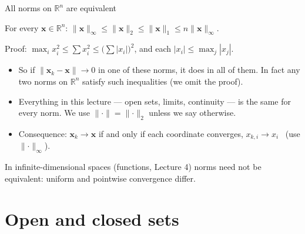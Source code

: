 \documentclass[10pt]{wosm-slides}
\newcommand{\R}{\mathbb{R}}
\newcommand{\norm}[1]{\lVert #1 \rVert}
\newcommand{\vx}{\mathbf{x}}
\begin{document}
\begin{frame}{All norms on $\R^n$ are equivalent}
  \begin{theorem}
    For every $\vx \in \R^n$: \quad
    $\norm{\vx}_\infty \le \norm{\vx}_2 \le \norm{\vx}_1 \le n \norm{\vx}_\infty$.
  \end{theorem}
  \pause
  {\small Proof: $\max_i x_i^2 \le \sum x_i^2 \le \bigl(\sum |x_i|\bigr)^2$, and each
  $|x_i| \le \max_j |x_j|$.\par}
  \pause
  \begin{itemize}
    \item So if $\norm{\vx_k - \vx} \to 0$ in one of these norms, it does in all of them.
      In fact any two norms on $\R^n$ satisfy such inequalities (we omit the proof).
    \item Everything in this lecture --- open sets, limits, continuity --- is the same for every
      norm. We use $\norm{\cdot} = \norm{\cdot}_2$ unless we say otherwise.
    \item Consequence: $\vx_k \to \vx$ if and only if each coordinate converges,
      $x_{k,i} \to x_i$ \ (use $\norm{\cdot}_\infty$).
  \end{itemize}
  {\small In infinite-dimensional spaces (functions, Lecture 4) norms need not be equivalent:
  uniform and pointwise convergence differ.\par}
\end{frame}

\section{Open and closed sets}
\end{document}
